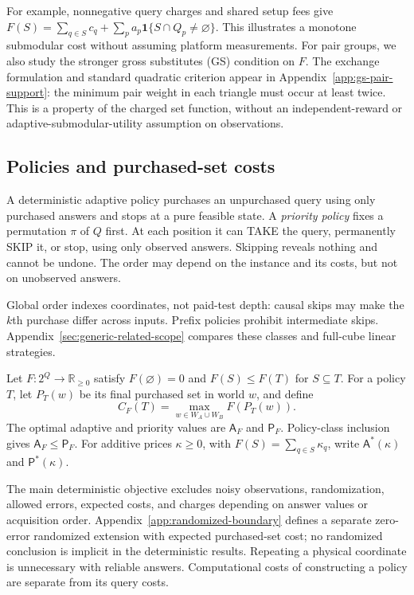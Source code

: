 \documentclass[pdflatex,sn-mathphys-num]{sn-jnl}
\newcommand{\A}{\mathsf{A}}
\newcommand{\Pcost}{\mathsf{P}}
\theoremstyle{thmstyleone}
\theoremstyle{thmstylethree}
\theoremstyle{thmstyletwo}
\begin{document}
For example, nonnegative query charges and shared setup fees give
$F(S)=\sum_{q\in S}c_q+\sum_p a_p\mathbf1\{S\cap Q_p\ne\varnothing\}$.
This illustrates a monotone submodular cost without assuming platform measurements.
For pair groups, we also study the stronger gross substitutes (GS)
condition on $F$. The exchange formulation and standard quadratic
criterion appear in Appendix~\ref{app:gs-pair-support}: the minimum
pair weight in each triangle must occur at least twice. This is a
property of the charged set function, without an independent-reward
or adaptive-submodular-utility assumption on observations.

\subsection{Policies and purchased-set costs}
A deterministic adaptive policy purchases an unpurchased query using only purchased answers and stops at a pure feasible state. A \emph{priority policy} fixes a permutation $\pi$ of $Q$ first. At each position it can TAKE the query, permanently SKIP it, or stop, using only observed answers. Skipping reveals nothing and cannot be undone. The order may depend on the instance and its costs, but not on unobserved answers.

Global order indexes coordinates, not paid-test depth: causal skips may make the $k$th purchase differ across inputs. Prefix policies prohibit intermediate skips. Appendix~\ref{sec:generic-related-scope} compares these classes and full-cube linear strategies.

Let $F:2^Q\to\mathbb R_{\geq0}$ satisfy $F(\varnothing)=0$ and $F(S)\leq F(T)$ for $S\subseteq T$. For a policy $T$, let $P_T(w)$ be its final purchased set in world $w$, and define
\[
 C_F(T)=\max_{w\in W_A\cup W_B} F(P_T(w)).
\]
The optimal adaptive and priority values are $\A_F$ and $\Pcost_F$. Policy-class inclusion gives $\A_F\leq\Pcost_F$. For additive prices $\kappa\geq0$, with $F(S)=\sum_{q\in S}\kappa_q$, write $\A^*(\kappa)$ and $\Pcost^*(\kappa)$.

The main deterministic objective excludes noisy observations, randomization, allowed errors, expected costs, and charges depending on answer values or acquisition order. Appendix~\ref{app:randomized-boundary} defines a separate zero-error randomized extension with expected purchased-set cost; no randomized conclusion is implicit in the deterministic results. Repeating a physical coordinate is unnecessary with reliable answers. Computational costs of constructing a policy are separate from its query costs.
\end{document}
